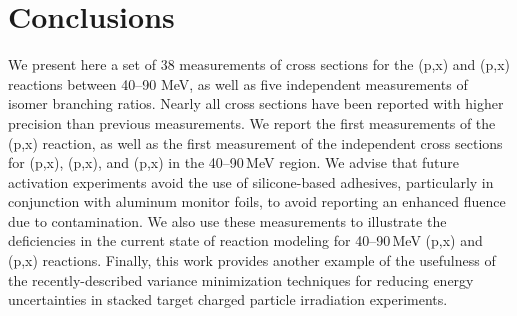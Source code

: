 
 
 
 
 \section{Conclusions}

We present here a set of 38 measurements of cross sections for the (p,x) and  (p,x) reactions between 40--90 MeV, as well as five independent measurements of isomer branching ratios.
Nearly all cross sections have been reported with higher precision than previous measurements.
We report the first measurements of the  (p,x) reaction, as well as the first measurement of the independent cross sections for    (p,x), (p,x), and (p,x) in the 40--90\,MeV region.
We advise that future activation experiments avoid the use of silicone-based adhesives, particularly in conjunction with aluminum monitor foils, to avoid reporting an enhanced fluence due to  contamination.
We also use these measurements to illustrate the deficiencies in the current state of  reaction modeling for 40--90\,MeV (p,x) and  (p,x) reactions.
Finally, this work provides another example of the usefulness of the recently-described variance minimization techniques for reducing energy uncertainties in stacked target charged particle irradiation experiments.
